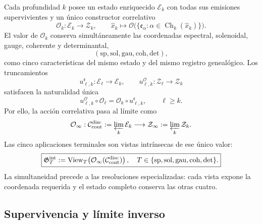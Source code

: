 {Cada profundidad \(k\) posee un estado enriquecido \(\mathcal E_k\) con
todas sus emisiones supervivientes y un único constructor correlativo
\begin{equation}
\mathcal O_k:\mathcal E_k\longrightarrow\mathcal Z_k,
\qquad
\widehat x_k\longmapsto
\mathcal O\bigl(\{\mathfrak e_\alpha:
\alpha\in\operatorname{Ch}_k(\widehat x_k)\}\bigr).
\label{p12-83-c3-s1:eq:five-features-single-constructor}
\end{equation}
El valor de \(\mathcal O_k\) conserva simultáneamente las coordenadas
espectral, solenoidal, gauge, coherente y determinantal,
\begin{equation}
(\mathrm{sp},\mathrm{sol},\mathrm{gau},\mathrm{coh},\mathrm{det}),
\label{p12-83-c3-s1:eq:five-features-coordinates}
\end{equation}
como cinco características del mismo estado y del mismo registro genealógico. Los
truncamientos
\[
u^{\mathfrak e}_{\ell,k}:\mathcal E_\ell\to\mathcal E_k,
\qquad
u^{\mathcal O}_{\ell,k}:\mathcal Z_\ell\to\mathcal Z_k
\]
satisfacen la naturalidad única
\begin{equation}
u^{\mathcal O}_{\ell,k}\circ\mathcal O_\ell
=\mathcal O_k\circ u^{\mathfrak e}_{\ell,k},
\qquad \ell\ge k.
\label{p12-83-c3-s1:eq:five-features-naturality}
\end{equation}
Por ello, la acción correlativa pasa al límite como
\begin{equation}
\mathcal O_\infty:
\mathcal C_{\rm cont}^{\rm disc}:=\varprojlim_k\mathcal E_k
\longrightarrow
\mathcal Z_\infty:=\varprojlim_k\mathcal Z_k.
\label{p12-83-c3-s1:eq:five-features-infinite-operator}
\end{equation}
Las cinco aplicaciones terminales son vistas intrínsecas de ese único valor:
\begin{equation}
\boxed{
\mathfrak G_T^{\rm int}:=
\operatorname{View}_T\!\left(
\mathcal O_\infty(\mathcal C_{\rm cont}^{\rm disc})\right),
\quad
T\in\{\mathrm{sp},\mathrm{sol},\mathrm{gau},
\mathrm{coh},\mathrm{det}\}.}
\label{p12-83-c3-s1:eq:five-features-views}
\end{equation}
La simultaneidad precede a las resoluciones especializadas: cada vista expone
la coordenada requerida y el estado completo conserva las otras cuatro.

\subsection{Supervivencia y límite inverso}

}
